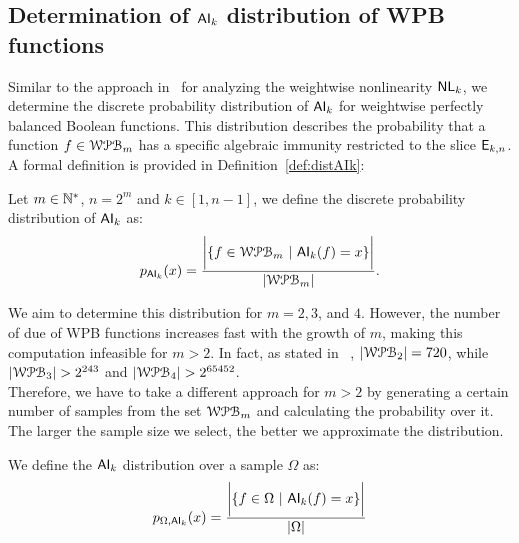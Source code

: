 \documentclass[11pt]{llncs}
\begin{document}
\subsection{Determination of $\mathsf{AI}_{k}$ distribution of WPB functions}



Similar to the approach in~\cite{Latin:GinMea23} for analyzing the weightwise nonlinearity $\mathsf{NL}_{k}$, we determine the discrete probability distribution of $\mathsf{AI}_{k}$ for weightwise perfectly balanced Boolean functions. 
This distribution describes the probability that a function $f \in \mathcal{WPB}_{m}$ has a specific algebraic immunity restricted to the slice $\mathsf{E}_{k,n}$. 
A formal definition is provided in Definition~\ref{def:distAIk}:

\begin{definition}\label{def:distAIk}
    Let $m \in \mathbb{N}^*$, $n = 2^m$ and $k \in [1,n-1]$, we define the discrete probability distribution of $\mathsf{AI}_{k}$ as:
    \begin{align*}
        p_{\mathsf{AI}_{k}}(x) = \frac{\bigg|\{f\in \mathcal{WPB}_{m}\  |\  \mathsf{AI}_{k}(f) = x\}\bigg|}{|\mathcal{WPB}_{m}|}.
    \end{align*}
\end{definition}

We aim to determine this distribution for $m = 2, 3$, and $4$. 
However, the number of due of WPB functions increases fast with the growth of $m$, making this computation infeasible for $m > 2$. In fact, as stated in ~\cite{Latin:GinMea23}, $|\mathcal{WPB}_{2}| = 720$, while $|\mathcal{WPB}_{3}| > 2^{243}$ and $|\mathcal{WPB}_{4}| > 2^{65452}$.\\
Therefore, we have to take a different approach for $m > 2$ by generating a certain number of samples from the set $\mathcal{WPB}_{m}$ and calculating the probability over it. The larger the sample size we select, the better we approximate the distribution.

\begin{definition}
    We define the $\mathsf{AI}_{k}$ distribution over a sample $\Omega$ as:
    \begin{align*}
        p_{\Omega,\mathsf{AI}_{k} }(x) =  \frac{\bigg|\{f\in \Omega\ | \  \mathsf{AI}_{k}(f) = x\}\bigg|}{|\Omega|}
    \end{align*}
\end{definition}
\end{document}
